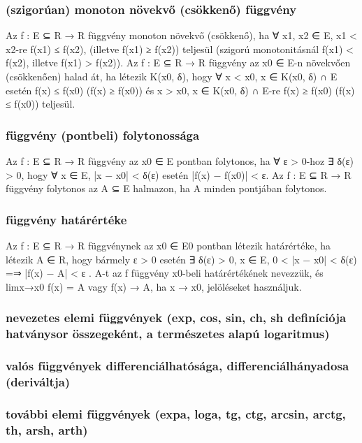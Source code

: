 \documentclass[12pt]{article}
\begin{document}
\subsubsection{(szigorúan) monoton növekvő (csökkenő) függvény}

Az f : E ⊆ R → R függvény monoton növekvő (csökkenő),
ha ∀ x1, x2 ∈ E, x1 < x2-re f(x1) ≤ f(x2), (illetve f(x1) ≥ f(x2))
teljesül (szigorú monotonitásnál f(x1) < f(x2), illetve f(x1) > f(x2)).
Az f : E ⊆ R → R függvény az x0 ∈ E-n növekvően (csökkenően) halad át,
ha létezik K(x0, δ), hogy ∀ x < x0, x ∈ K(x0, δ) ∩ E esetén
f(x) ≤ f(x0) (f(x) ≥ f(x0))
és x > x0, x ∈ K(x0, δ) ∩ E-re
f(x) ≥ f(x0) (f(x) ≤ f(x0))
teljesül.

\subsubsection{függvény (pontbeli) folytonossága}

Az f : E ⊆ R → R függvény az x0 ∈ E pontban folytonos,
ha ∀ ε > 0-hoz ∃ δ(ε) > 0, hogy ∀ x ∈ E, |x − x0| < δ(ε) esetén |f(x) −
f(x0)| < ε.
Az f : E ⊆ R → R függvény folytonos az A ⊆ E halmazon, ha A minden
pontjában folytonos.

\subsubsection{függvény határértéke}

Az f : E ⊆ R → R függvénynek az x0 ∈ E0 pontban létezik
határértéke, ha létezik A ∈ R, hogy bármely ε > 0 esetén ∃ δ(ε) > 0,
x ∈ E, 0 < |x − x0| < δ(ε) =⇒ |f(x) − A| < ε .
A-t az f függvény x0-beli határértékének nevezzük, és limx→x0
f(x) = A vagy
f(x) → A, ha x → x0, jelöléseket használjuk.

\subsubsection{nevezetes elemi függvények (exp, cos, sin, ch, sh
definíciója hatványsor összegeként, a természetes alapú logaritmus)}
\subsubsection{valós függvények
differenciálhatósága, differenciálhányadosa (deriváltja)}
\subsubsection{további elemi függvények
(expa, loga, tg, ctg, arcsin, arctg, th, arsh, arth)}
\end{document}
